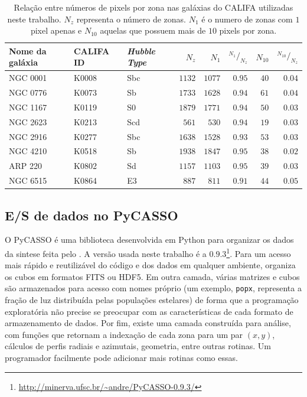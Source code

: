 \begin{table}
	\caption[Relação de pixels e zonas em algumas galáxias do CALIFA]
	{Relação entre números de pixels por zona nas galáxias do CALIFA utilizadas
	neste trabalho. $N_z$ representa o número de zonas. $N_1$ é o numero de zonas
	com $1$ pixel apenas e $N_{10}$ aquelas que possuem mais de $10$ pixels por
	zona.}
	\begin{tabular}{l l l r r r r r}
		Nome da galáxia & CALIFA ID & {\em Hubble Type} & $N_z$ & $N_{1}$ &
		${}^{N_1}/_{N_z}$ & $N_{10}$ & ${}^{N_{10}}/_{N_z}$
		\\
		\midrule
		NGC 0001 & K0008 & Sbc & $1132$ & $1077$ & $0.95$ & $40$ & $0.04$ \\
		NGC 0776 & K0073 & Sb & $1733$ & $1628$ & $0.94$ & $61$ & $0.04$ \\
		NGC 1167 & K0119 & S0 & $1879$ & $1771$ & $0.94$ & $50$ & $0.03$ \\
		NGC 2623 & K0213 & Scd & $561$ & $530$ & $0.94$ & $19$ & $0.03$ \\
		NGC 2916 & K0277 & Sbc & $1638$ & $1528$ & $0.93$ & $53$ & $0.03$ \\
		NGC 4210 & K0518 & Sb & $1938$ & $1847$ & $0.95$ & $38$ & $0.02$ \\
		ARP 220 & K0802 & Sd & $1157$ & $1103$ & $0.95$ & $39$ & $0.03$ \\
		NGC 6515 & K0864 & E3 & $887$ & $811$ & $0.91$ & $44$ & $0.05$ \\
	\end{tabular}
	\label{tab:pixelZones}
\end{table}
\subsection{E/S de dados no PyCASSO}

O PyCASSO é uma biblioteca desenvolvida em Python para organizar os dados da
sintese feita pelo \starlight. A versão usada neste trabalho é a
$0.9.3$\footnote{\url{http://minerva.ufsc.br/~andre/PyCASSO-0.9.3/}}. Para um
acesso mais rápido e reutilizável do código e dos dados em qualquer ambiente,
organiza os cubos em formatos FITS ou HDF5. Em outra camada, várias matrizes e
cubos são armazenados para acesso com nomes próprio (um exemplo, \texttt{popx},
representa a fração de luz distribuída pelas populações estelares) de forma que
a programação exploratória não precise se preocupar com as características de
cada formato de armazenamento de dados. Por fim, existe uma camada construída
para análise, com funções que retornam a indexação de cada zona para um par $(x,
y)$, cálculos de perfis radiais e azimutais, geometria, entre outras rotinas. Um
programador facilmente pode adicionar mais rotinas como essas.

